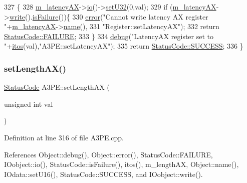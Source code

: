 \begin{DoxyCode}
327                                              \{
328   \hyperlink{classA3PE_a061472eb539bb6ac99f4fa11a760eeaf}{m\_latencyAX}->\hyperlink{classIOobject_af04fb94137c3d86849f478ac5afab5d1}{io}()->\hyperlink{classIOdata_abbed9a057203bc763f97b85fb385f36b}{setU32}(0,val);
329   \textcolor{keywordflow}{if} (\hyperlink{classA3PE_a061472eb539bb6ac99f4fa11a760eeaf}{m\_latencyAX}->\hyperlink{classIOobject_a9f6984bc9f0fadcf800f1be2523ac744}{write}().\hyperlink{classStatusCode_a5dd22dc6eb2c52fc4cabc58f6dea2eb7}{isFailure}())\{
330     \hyperlink{classObject_a204a95f57818c0f811933917a30eff45}{error}(\textcolor{stringliteral}{"Cannot write latency AX register "}+\hyperlink{classA3PE_a061472eb539bb6ac99f4fa11a760eeaf}{m\_latencyAX}->\hyperlink{classObject_a300f4c05dd468c7bb8b3c968868443c1}{name}(),
331         \textcolor{stringliteral}{"Register::setLatencyAX"});
332     \textcolor{keywordflow}{return} \hyperlink{classStatusCode_a6f565cbeadc76d14c72f047e5e85eb4ba3da73d4c469762eb9d3c960368252b26}{StatusCode::FAILURE};
333   \}
334   \hyperlink{classObject_aac010553f022165573714b7014a15f0d}{debug}(\textcolor{stringliteral}{"LatencyAX register set to "}+\hyperlink{Tools_8h_af330027dbdafb9a30768b3613c553e60}{itos}(val),\textcolor{stringliteral}{"A3PE::setLatencyAX"});
335   \textcolor{keywordflow}{return} \hyperlink{classStatusCode_a6f565cbeadc76d14c72f047e5e85eb4badd0da38d3ba0d922efd1f4619bc37ad8}{StatusCode::SUCCESS};
336 \}
\end{DoxyCode}
\mbox{\label{classA3PE_a0300aa5c5ed02b82275c1de434196b9a}} 
\subsubsection{\texorpdfstring{set\+Length\+A\+X()}{setLengthAX()}}
{\footnotesize\ttfamily \hyperlink{classStatusCode}{Status\+Code} A3\+P\+E\+::set\+Length\+AX (\begin{DoxyParamCaption}\item[{unsigned int}]{val }\end{DoxyParamCaption})}



Definition at line 316 of file A3\+P\+E.\+cpp.



References Object\+::debug(), Object\+::error(), Status\+Code\+::\+F\+A\+I\+L\+U\+RE, I\+Oobject\+::io(), Status\+Code\+::is\+Failure(), itos(), m\+\_\+length\+AX, Object\+::name(), I\+Odata\+::set\+U16(), Status\+Code\+::\+S\+U\+C\+C\+E\+SS, and I\+Oobject\+::write().



